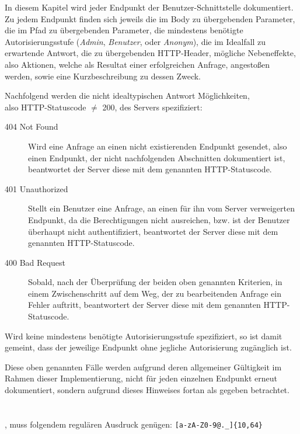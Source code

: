 In diesem Kapitel wird jeder Endpunkt der Benutzer-Schnittstelle dokumentiert. Zu jedem Endpunkt finden sich jeweils die im Body zu übergebenden Parameter, die im Pfad zu übergebenden Parameter, die mindestens benötigte Autorisierungsstufe (\textit{Admin}, \textit{Benutzer}, oder \textit{Anonym}), die im Idealfall zu erwartende Antwort, die zu übergebenden HTTP-Header, mögliche Nebeneffekte, also Aktionen, welche als Resultat einer erfolgreichen Anfrage, angestoßen werden, sowie eine Kurzbeschreibung zu dessen Zweck.\medskip 

\noindent
Nachfolgend werden die nicht idealtypischen Antwort Möglichkeiten,\\ also HTTP-Statuscode $\neq$ 200, des Servers spezifiziert:
\begin{description}
\item[404 Not Found] Wird eine Anfrage an einen nicht existierenden Endpunkt gesendet, also einen Endpunkt, der nicht nachfolgenden Abschnitten dokumentiert ist, beantwortet der Server diese mit dem genannten HTTP-Statuscode.
\item[401 Unauthorized] Stellt ein Benutzer eine Anfrage, an einen für ihn vom Server verweigerten Endpunkt, da die Berechtigungen nicht ausreichen, bzw. ist der Benutzer überhaupt nicht authentifiziert, beantwortet der Server diese mit dem genannten HTTP-Statuscode.  
\item[400 Bad Request] Sobald, nach der Überprüfung der beiden oben genannten Kriterien, in einem Zwischenschritt auf dem Weg, der zu bearbeitenden Anfrage ein Fehler auftritt, beantwortert der Server diese mit dem genannten HTTP-Statuscode.
\end{description}\medskip

\noindent
Wird keine mindestens benötigte Autorisierungsstufe spezifiziert, so ist damit gemeint, dass der jeweilige Endpunkt ohne jegliche Autorisierung zugänglich ist.\bigskip

\noindent
Diese oben genannten Fälle werden aufgrund deren allgemeiner Gültigkeit im Rahmen dieser Implementierung, nicht für jeden einzelnen Endpunkt erneut dokumentiert, sondern aufgrund dieses Hinweises fortan als gegeben betrachtet.


\section*{}
, muss folgendem regulären Ausdruck genügen: \verb![a-zA-Z0-9@._]{10,64}!


